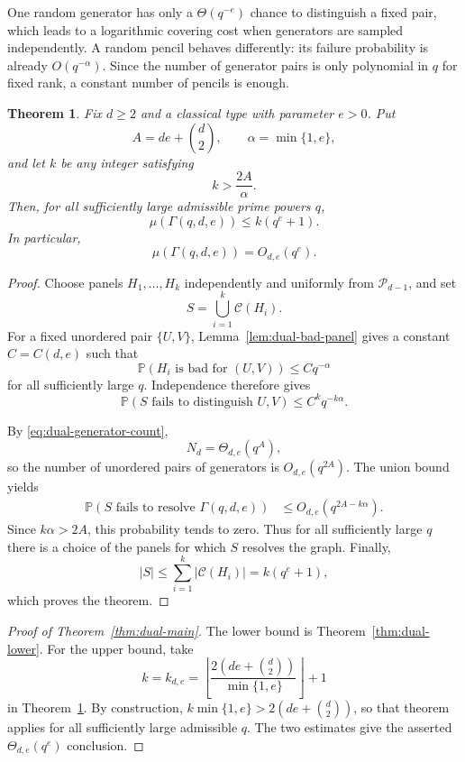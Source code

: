 \documentclass[11pt]{article}
\newtheorem{theorem}{Theorem}[section]
\theoremstyle{definition}
\theoremstyle{remark}
\newcommand{\Prob}{\mathbb P}
\begin{document}
One random generator has only a $\Theta(q^{-e})$ chance to distinguish a
fixed pair, which leads to a logarithmic covering cost when generators are
sampled independently.  A random pencil behaves differently: its failure
probability is already $O(q^{-\alpha})$.  Since the number of generator 
pairs
is only polynomial in $q$ for fixed rank, a constant number of pencils is
enough.

\begin{theorem}\label{thm:dual-upper}
Fix $d\geq2$ and a classical type with parameter $e>0$.  Put
\[
        A=de+\binom d2,
        \qquad
        \alpha=\min\{1,e\},
\]
and let $k$ be any integer satisfying
\[
        k>\frac{2A}{\alpha}.
\]
Then, for all sufficiently large admissible prime powers $q$,
\[
        \mu(\Gamma(q,d,e))\leq k(q^e+1).
\]
In particular,
\[
        \mu(\Gamma(q,d,e))=O_{d,e}(q^e).
\]
\end{theorem}

\begin{proof}
Choose panels $H_1,\ldots,H_k$ independently and uniformly from
$\mathcal P_{d-1}$, and set
\[
        S=\bigcup_{i=1}^k\mathcal C(H_i).
\]
For a fixed unordered pair $\{U,V\}$, Lemma~\ref{lem:dual-bad-panel}
gives a constant $C=C(d,e)$ such that
\[
        \Prob(H_i\text{ is bad for }(U,V))\leq Cq^{-\alpha}
\]
for all sufficiently large $q$.  Independence therefore gives
\[
        \Prob(S\text{ fails to distinguish }U,V)
        \leq C^kq^{-k\alpha}.
\]

By \eqref{eq:dual-generator-count},
\[
        N_d=\Theta_{d,e}(q^A),
\]
so the number of unordered pairs of generators is $O_{d,e}(q^{2A})$.
The union bound yields
\[
\begin{aligned}
        \Prob(S\text{ fails to resolve }\Gamma(q,d,e))
        &\leq O_{d,e}(q^{2A-k\alpha}).
\end{aligned}
\]
Since $k\alpha>2A$, this probability tends to zero.  Thus for all
sufficiently large $q$ there is a choice of the panels for which $S$
resolves the graph.  Finally,
\[
        |S|\leq\sum_{i=1}^k|\mathcal C(H_i)|
        =k(q^e+1),
\]
which proves the theorem.
\end{proof}


\begin{proof}[Proof of Theorem~\ref{thm:dual-main}]
The lower bound is Theorem~\ref{thm:dual-lower}.  For the upper bound, 
take
\[
        k=k_{d,e}
        =\left\lfloor
          \frac{2\left(de+\binom d2\right)}{\min\{1,e\}}
          \right\rfloor+1
\]
in Theorem~\ref{thm:dual-upper}.  By construction,
$k\min\{1,e\}>2\left(de+\binom d2\right)$, so that theorem applies for all
sufficiently large admissible $q$.  The two estimates give the asserted
$\Theta_{d,e}(q^e)$ conclusion.
\end{proof}
\end{document}
